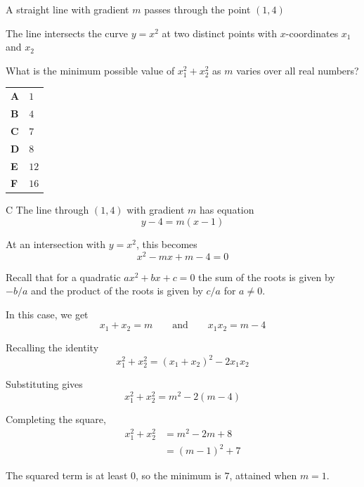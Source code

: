 \documentclass[11pt,a4paper]{article}
\begin{document}
\begin{enumerate}[label=\textbf{\arabic*.},leftmargin=*,itemsep=0pt,start=2]
\questionitem[Algebra]
A straight line with gradient $m$ passes through the point $(1, 4)$

The line intersects the curve $y = x^2$ at two distinct points with $x$-coordinates $x_1$ and $x_2$

What is the minimum possible value of $x_1^2 + x_2^2$ as $m$ varies over all real numbers?

\par\vspace*{12pt}
\begin{tabularx}{\linewidth}{@{}>{\bfseries}l Y@{}}
A &
$1$
\\[0.8em]
B &
$4$
\\[0.8em]
C &
$7$
\\[0.8em]
D &
$8$
\\[0.8em]
E &
$12$
\\[0.8em]
F &
$16$
\\
\end{tabularx}

\begin{djsSolution}{C}
The line through $(1,4)$ with gradient $m$ has equation
\[
y-4=m(x-1)
\]

At an intersection with $y=x^2$, this becomes
\[
x^2-mx+m-4=0
\]

Recall that for a quadratic $ax^2+bx+c=0$ the sum of the roots is given by $-b/a$ and the product of the roots is given by $c/a$ for $a\neq0$.

In this case, we get 
\[ x_1 + x_2=m \qquad \text{and} \qquad x_1x_2=m-4\]

Recalling the identity
\[
x_1^2+x_2^2=(x_1+x_2)^2-2x_1x_2
\]

Substituting gives
\[
x_1^2+x_2^2=m^2-2(m-4)
\]

Completing the square,
\[
\begin{aligned}
x_1^2+x_2^2&=m^2-2m+8\\[5pt]
&=(m-1)^2+7
\end{aligned}
\]

The squared term is at least $0$, so the minimum is $7$, attained when $m=1$. 


\end{djsSolution}
\end{enumerate}
\end{document}
